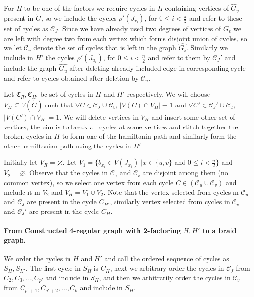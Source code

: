\documentclass[svgnames]{llncs}
\newcommand{\braid}{braid}
\begin{document}
{For $H$ to be one of the factors we require cycles in $H$ containing vertices of $\hat{G}_v$ present in $\tilde{G}$, so we include the cycles $\rho'(J_{v_i})$, for $0 \leq i < \frac{n}{2}$ and
refer to these set of cycles as $\mathcal{C}_J$. Since we have already used two degrees of vertices of $G_v$ we are left with degree two from each vertex which forms disjoint union of cycles, so we let $\mathcal{C}_v$ denote the set of cycles that is left in the graph $\hat{G_v}$. Similarly we include in $H'$ the cycles $\rho'(J_{u_i})$, for $0 \leq i < \frac{n}{2}$ and refer to them by $\mathcal{C}_J'$
and include the graph $\hat{G_u}$ after deleting already included edge in corresponding cycle and refer to cycles obtained after deletion by $\mathcal{C}_u$.



Let $\mathfrak{C}_H,\mathfrak{C}_{H'}$ be set of cycles in $H$ and $H'$ respectively.
We will choose $V_H \subseteq V(\tilde{G})$ such that $\forall C \in \mathcal{C}_J \cup \mathcal{C}_v$, $\lvert V(C) \cap V_H \rvert = 1$ and $\forall C' \in \mathcal{C}_J' \cup \mathcal{C}_u$,
$\lvert V(C') \cap V_H \rvert = 1$.
We will delete vertices in $V_H$ and insert some other set of vertices, the aim is to break all cycles at some vertices 
and stitch together the broken cycles in $H$ to form one of the hamiltonin path and similarly form the other hamiltonian path using
the cycles in $H'$.

Initially let $V_H = \varnothing$. Let $V_1= \{b_{x_i} \in V(J_{x_i})$  $ \lvert x \in \{u,v\}$ and $0 \leq i < \frac{n}{2}\}$ and $V_2=\varnothing$. Observe that the cycles in $\mathcal{C}_u$ and $\mathcal{C}_v$ are disjoint among them (no common vertex), so we select one vertex from each cycle $C \in (\mathcal{C}_u \cup \mathcal{C}_v)$ and include it in $V_2$ and 
$V_H=V_1 \cup V_2$.
Note that the vertex selected from cycles in $\mathcal{C}_u$ and $\mathcal{C}_J$ are present in the cycle $C_{H'}$,
similarly vertex selected from cycles in $\mathcal{C}_v$ and $\mathcal{C}_J'$ are present in the cycle $C_{H}$.

\paragraph{From Constructed 4-regular graph with 2-factoring $H,H'$ to a \braid{} graph.} We order the cycles in $H$ and $H'$ and call the ordered sequence of cycles as $S_H,S_{H'}$. The first cycle in $S_H$ is $C_H$, 
next we arbitrary order the cycles in $\mathcal{C}_{J}$
from $C_2,C_3,...,C_{p'}$ and include in $S_H$,
and then we arbitrarily order the cycles in $\mathcal{C}_v$ from $C_{p'+1},C_{p'+2},...,C_k$ and include in $S_H$.

}
\end{document}
